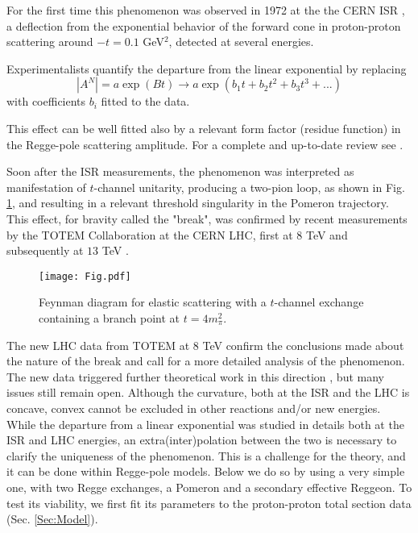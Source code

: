 \documentclass[aps,prd,superscriptaddress,showpacs,preprintnumbers]{revtex4}
\begin{document}
For the first time this phenomenon  was observed in 1972 at the the CERN ISR \cite{Bar}, 
a deflection from the exponential behavior of the forward cone in proton-proton scattering 
around $-t=0.1$ GeV$^2$, detected at several energies. 

Experimentalists \cite{TOTEM8, TOTEM13, Bar} quantify the departure from the linear exponential by replacing 
\begin{equation}
|A^N|=a \exp(Bt)\rightarrow a\exp(b_1 t+b_2 t^2+b_3 t^3+...)
\end{equation}
with coefficients $b_i$ fitted to the data. 

This effect can be well fitted \cite{Lia} also by a relevant form factor (residue function) in the Regge-pole scattering amplitude. For a complete and up-to-date review see \cite{Yogi}.

Soon after the ISR measurements, the phenomenon was interpreted \cite{LNC} as manifestation of $t$-channel unitarity, producing a two-pion loop, as
shown in Fig. \ref{Fig:Diagram}, and resulting in a relevant threshold singularity in the Pomeron trajectory. This effect, for bravity called the "break", was confirmed by recent measurements by the TOTEM Collaboration at the CERN LHC, first at $8$ TeV \cite{TOTEM8} and subsequently at $13$ TeV \cite{TOTEM13}.

\begin{figure}[ht] 
\centering
\texttt{[image: Fig.pdf]}
\caption{Feynman diagram for elastic scattering with a $t$-channel exchange containing a branch point at $t=4m_{\pi}^2$.} 
\label{Fig:Diagram}
\end{figure}

The new LHC data from TOTEM at $8$ TeV confirm the conclusions made \cite{LNC} about the nature of the break and call for a more detailed analysis of the phenomenon. The new data triggered further theoretical work in this direction \cite{Lengyel, Brazil}, but many issues still remain open. Although the curvature, both at the ISR and the LHC is concave, convex cannot be excluded in other reactions and/or new energies. While the departure from a linear exponential was studied in details both at the ISR and LHC energies, an extra(inter)polation between the two is necessary to clarify the uniqueness of the phenomenon. This is a challenge for the theory, and it can be done within Regge-pole models. Below we do so by using a very simple one, with two Regge exchanges, a Pomeron and a 
secondary effective Reggeon. To test its viability, we first fit its parameters to the proton-proton total section data (Sec. \ref{Sec:Model}).   
\end{document}
